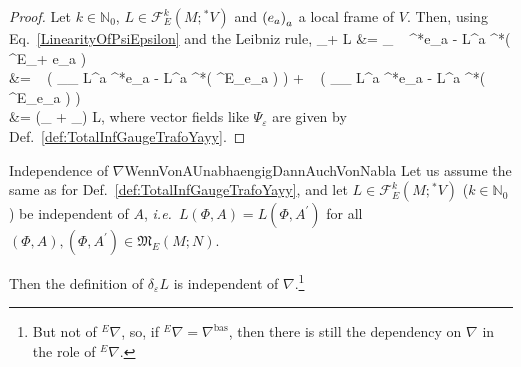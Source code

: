 \documentclass[CM,GP]{degruyter-crelle}       %
\def\bas#1\eas{\begin{align*}#1\end{align*}}
\theoremstyle{plain}
\theoremstyle{remark}
\theoremstyle{definition}
\begin{document}
\begin{proof}
\leavevmode\newline
Let $k \in \mathbb{N}_0$, $L \in \mathcal{F}^k_E(M; {}^*V)$ and $\mleft( e_a \mright)_a$ a local frame of $V$. Then, using Eq.~\eqref{LinearityOfPsiEpsilon} and the Leibniz rule,
\bas
\delta_{\alpha \varepsilon + \beta \vartheta} L
&=
_{ }
 \otimes ~ {}^*e_a
	- L^a \otimes {}^*\mleft( {}^E\nabla_{\alpha \varepsilon + \beta \vartheta} e_a \mright)
\\
&=
\alpha ~ \mleft(
	_{\Psi_\varepsilon} L^a \otimes {}^*e_a
	- L^a \otimes {}^*\mleft( {}^E\nabla_\varepsilon e_a \mright)
\mright)
	+ \beta ~ \mleft(
	_{\Psi_\vartheta} L^a \otimes {}^*e_a
	- L^a \otimes {}^*\mleft( {}^E\nabla_\vartheta e_a \mright)
\mright)
\\
&=
\mleft(\alpha \delta_\varepsilon
	+ \beta \delta_\vartheta\mright) L,
\eas
where vector fields like $\Psi_\varepsilon$ are given by Def.~\ref{def:TotalInfGaugeTrafoYayy}.
\end{proof}

\begin{corollaries}{Independence of $\nabla$}{WennVonAUnabhaengigDannAuchVonNabla}
Let us assume the same as for Def.~\ref{def:TotalInfGaugeTrafoYayy}, and let $L \in \mathcal{F}^k_E(M; {}^*V)$ ($k \in \mathbb{N}_0$) be independent of $A$, \textit{i.e.}~$L(\Phi,A) = L(\Phi, A^\prime)$ for all $(\Phi,A), (\Phi, A^\prime) \in \mathfrak{M}_E(M; N)$.

Then the definition of $\delta_\varepsilon L$ is independent of $\nabla$.\footnote{But not of ${}^E\nabla$, so, if ${}^E\nabla = \nabla^{\mathrm{bas}}$, then there is still the dependency on $\nabla$ in the role of ${}^E\nabla$.}
\end{corollaries}
\end{document}
